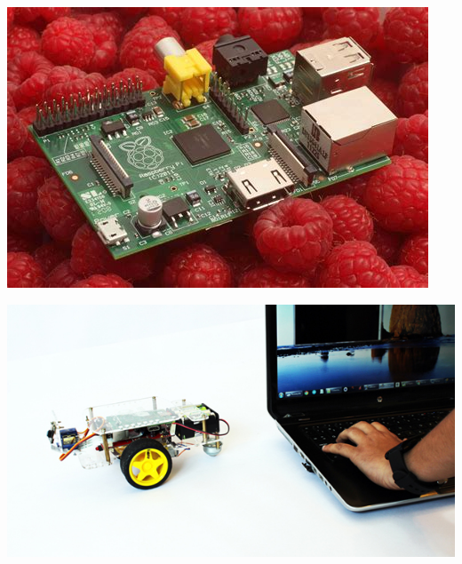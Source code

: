 \documentclass[french,handout]{beamer}
\begin{document}
\begin{frame}
  
\begin{center}
  \includegraphics[width=\linewidth]{raspberry}
\end{center}

\end{frame}





\begin{frame}
  
\begin{center}
  \includegraphics[width=\linewidth]{gopigo}
\end{center}

\end{frame}
\end{document}
